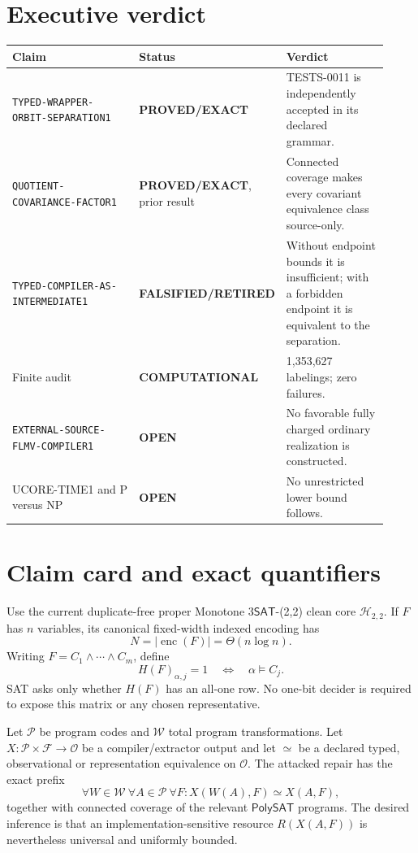 \documentclass[11pt]{article}
\newcommand{\SAT}{\mathsf{SAT}}
\newcommand{\PolySAT}{\mathsf{PolySAT}}
\newcommand{\EXACT}{\textbf{PROVED/EXACT}}
\newcommand{\OPEN}{\textbf{OPEN}}
\newcommand{\RETIRED}{\textbf{FALSIFIED/RETIRED}}
\newcommand{\COMP}{\textbf{COMPUTATIONAL}}
\begin{document}
\section{Executive verdict}
\begin{center}\small
\begin{tabular}{@{}p{0.41\linewidth}p{0.20\linewidth}p{0.31\linewidth}@{}}
\toprule
Claim & Status & Verdict\\ \midrule
\texttt{TYPED-WRAPPER-ORBIT-SEPARATION1} & \EXACT &
TESTS-0011 is independently accepted in its declared grammar.\\
\texttt{QUOTIENT-COVARIANCE-FACTOR1} & \EXACT, prior result &
Connected coverage makes every covariant equivalence class source-only.\\
\texttt{TYPED-COMPILER-AS-INTERMEDIATE1} & \RETIRED &
Without endpoint bounds it is insufficient; with a forbidden endpoint it is
equivalent to the separation.\\
Finite audit & \COMP & 1,353,627 labelings; zero failures.\\
\texttt{EXTERNAL-SOURCE-FLMV-COMPILER1} & \OPEN &
No favorable fully charged ordinary realization is constructed.\\
UCORE-TIME1 and P versus NP & \OPEN & No unrestricted lower bound follows.\\
\bottomrule
\end{tabular}
\end{center}

\section{Claim card and exact quantifiers}
Use the current duplicate-free proper Monotone \(3\SAT\)-(2,2) clean core
\(\mathcal H_{2,2}\).  If \(F\) has \(n\) variables, its canonical
fixed-width indexed encoding has
\[
 N=|\operatorname{enc}(F)|=\Theta(n\log n).
\]
Writing \(F=C_1\wedge\cdots\wedge C_m\), define
\[
 H(F)_{\alpha,j}=1\quad\Longleftrightarrow\quad\alpha\models C_j.
\]
SAT asks only whether \(H(F)\) has an all-one row.  No one-bit decider is
required to expose this matrix or any chosen representative.

Let \(\mathcal P\) be program codes and \(\mathcal W\) total program
transformations.  Let \(X:\mathcal P\times\mathcal F\to\mathcal O\)
be a compiler/extractor output and let \(\simeq\) be a declared typed,
observational or representation equivalence on \(\mathcal O\).  The
attacked repair has the exact prefix
\[
 \forall W\in\mathcal W\ \forall A\in\mathcal P\ \forall F:
 X(W(A),F)\simeq X(A,F),
 \tag{COV}
\]
together with connected coverage of the relevant \(\PolySAT\) programs.
The desired inference is that an implementation-sensitive resource
\(R(X(A,F))\) is nevertheless universal and uniformly bounded.
\end{document}
